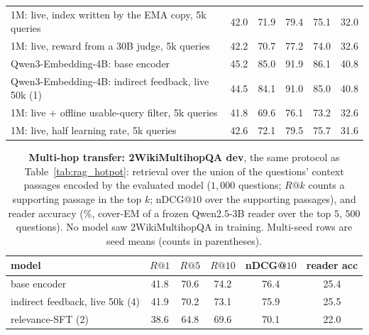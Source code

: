 \begin{table}[H]
\begin{tabular}{lccccc}
1M: live, index written by the EMA copy, 5k queries & 42.0 & 71.9 & 79.4 & 75.1 & 32.0 \\
1M: live, reward from a 30B judge, 5k queries & 42.2 & 70.7 & 77.2 & 74.0 & 32.6 \\
\midrule
Qwen3-Embedding-4B: base encoder & 45.2 & 85.0 & 91.9 & 86.1 & 40.8 \\
Qwen3-Embedding-4B: indirect feedback, live 50k (1) & 44.5 & 84.1 & 91.0 & 85.0 & 40.8 \\
1M: live $+$ offline usable-query filter, 5k queries & 41.8 & 69.6 & 76.1 & 73.2 & 32.6 \\
1M: live, half learning rate, 5k queries & 42.6 & 72.1 & 79.5 & 75.7 & 31.6 \\
\bottomrule
\end{tabular}
\end{table}

\begin{table}[H]
\centering\small
\caption{\textbf{Multi-hop transfer: 2WikiMultihopQA dev}, the same protocol as Table~\ref{tab:rag_hotpot}: retrieval over the
union of the questions' context passages encoded by the evaluated model ($1{,}000$ questions; $R@k$ counts a supporting
passage in the top $k$; nDCG@$10$ over the supporting passages), and reader accuracy (\%, cover-EM of a frozen Qwen2.5-3B
reader over the top $5$, $500$ questions). No model saw 2WikiMultihopQA in training. Multi-seed rows are seed means
(counts in parentheses).}
\label{tab:rag_2wiki}
\begin{tabular}{lccccc}
\toprule
model & $R@1$ & $R@5$ & $R@10$ & nDCG@$10$ & reader acc \\
\midrule
base encoder & 41.8 & 70.6 & 74.2 & 76.4 & 25.4 \\
indirect feedback, live 50k (4) & 41.9 & 70.2 & 73.1 & 75.9 & 25.5 \\
relevance-SFT (2) & 38.6 & 64.8 & 69.6 & 70.1 & 22.0 \\
\bottomrule
\end{tabular}
\end{table}

